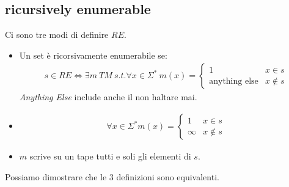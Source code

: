 \documentclass{article}
\begin{document}
\subsection{ricursively enumerable}
Ci sono tre modi di definire $RE$.
\begin{itemize}
    \item Un set è ricorsivamente enumerabile se:
        \begin{align*}
            s\in RE \iff \exists m\ TM\ s.t. \forall x\in\Sigma^*\ m(x)=\begin{cases}1&x\in s \\ \text{anything else} & x\not\in s\end{cases}
        \end{align*}
        \textit{Anything Else} include anche il non haltare mai.

    \item
        \begin{align*}
            \forall x\in\Sigma^* m(x)=\begin{cases}1&x\in s \\ \infty & x\not\in s\end{cases}
        \end{align*}

    \item $m$ scrive su un tape tutti e soli gli elementi di $s$.
\end{itemize}
Possiamo dimostrare che le 3 definizioni sono equivalenti.
\end{document}
